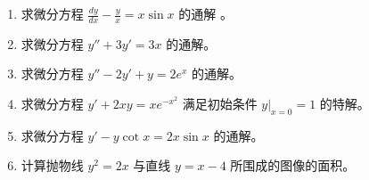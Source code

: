 \documentclass[12pt, a4paper]{article}
\newcommand{\blank}[1]{\underline{\hspace{#1}}}
\begin{document}
\begin{enumerate}
    \item 求微分方程 $ \frac{dy}{dx}-\frac{y}{x}=x\sin x $ 的通解 \blank{2cm}。

    \item 求微分方程 $ y'' + 3y' = 3x $ 的通解。

    \item 求微分方程 $ y''-2y'+y=2e^{x} $ 的通解。

    \item 求微分方程 $ y'+2xy=xe^{-x^{2}} $ 满足初始条件 $ y|_{x=0}=1 $ 的特解。

    \item 求微分方程 $ y' - y \cot x = 2x \sin x $ 的通解。

    \item 计算抛物线 $ y^{2} = 2x $ 与直线 $ y = x - 4 $ 所围成的图像的面积。
\end{enumerate}
\end{document}
